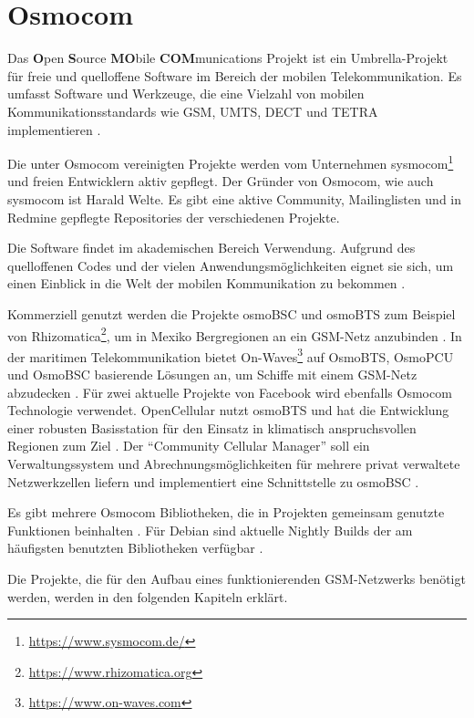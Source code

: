 \chapter{Osmocom} \label{hdl:grundlagen_osmocom}
Das \textbf{O}pen \textbf{S}ource \textbf{MO}bile \textbf{COM}munications Projekt ist ein Umbrella-Projekt für freie und quelloffene Software im Bereich der mobilen Telekommunikation. Es umfasst Software und Werkzeuge, die eine Vielzahl von mobilen Kommunikationsstandards wie \ac{GSM}, \ac{UMTS}, \ac{DECT} und \ac{TETRA} implementieren \citep{osmocom}.

Die unter Osmocom vereinigten Projekte werden vom Unternehmen sysmocom\footnote{\url{https://www.sysmocom.de/}} und freien Entwicklern aktiv gepflegt. Der Gründer von Osmocom, wie auch sysmocom ist Harald Welte. Es gibt eine aktive Community, Mailinglisten und in Redmine gepflegte Repositories der verschiedenen Projekte.

Die Software findet im akademischen Bereich Verwendung. Aufgrund des quelloffenen Codes und der vielen Anwendungsmöglichkeiten eignet sie sich, um einen Einblick in die Welt der mobilen Kommunikation zu bekommen \citep{osmocom:bb-project-rationale}.

Kommerziell genutzt werden die Projekte osmoBSC und osmoBTS zum Beispiel von Rhizomatica\footnote{\url{https://www.rhizomatica.org}}, um in Mexiko Bergregionen an ein \ac{GSM}-Netz anzubinden \citep{osmocom:news-rhizomatica}. In der maritimen Telekommunikation bietet On-Waves\footnote{\url{https://www.on-waves.com}} auf OsmoBTS, OsmoPCU und OsmoBSC basierende Lösungen an, um Schiffe mit einem \ac{GSM}-Netz abzudecken \citep{osmocon:onwaves}. Für zwei aktuelle Projekte von Facebook wird ebenfalls Osmocom Technologie verwendet. OpenCellular nutzt osmoBTS und hat die Entwicklung einer robusten Basisstation für den Einsatz in klimatisch anspruchsvollen Regionen zum Ziel \citep{osmocon:opencellular}. Der "`Community Cellular Manager"' soll ein Verwaltungssystem und Abrechnungsmöglichkeiten für mehrere privat verwaltete Netzwerkzellen liefern und implementiert eine Schnittstelle zu osmoBSC \citep{osmocon:communityCellularManager}.

Es gibt mehrere Osmocom Bibliotheken, die in Projekten gemeinsam genutzte Funktionen beinhalten \citep{osmocom:libraries}. Für Debian sind aktuelle Nightly Builds der am häufigsten benutzten Bibliotheken verfügbar \citep{osmocom:nightly-builds}.

Die Projekte, die für den Aufbau eines funktionierenden \ac{GSM}-Netzwerks benötigt werden, werden in den folgenden Kapiteln erklärt. 

